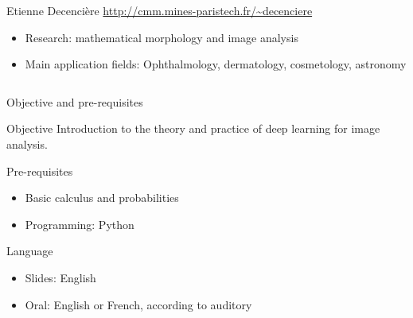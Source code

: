 \documentclass[xcolor=pdftex,dvipsnames,table,mathserif]{beamer}
\begin{document}
{\begin{columns}
\begin{column}{.8\textwidth}
    \begin{block}{Etienne Decencière \hfill \scriptsize{\url{http://cmm.mines-paristech.fr/\~decenciere}}}
      \scriptsize{
    \begin{itemize}
    \item Research: mathematical morphology and image analysis
    \item Main application fields: Ophthalmology, dermatology, cosmetology, astronomy
    \end{itemize}
    }
  \end{block}

  \end{column}
\end{columns}

}

\begin{frame}{Objective and pre-requisites}

  \begin{block}{Objective}
    Introduction to the theory and practice of deep learning for image analysis.
\end{block}

\begin{block}{Pre-requisites}
\begin{itemize}
\item Basic calculus and probabilities
\item Programming: Python
\end{itemize}
  \end{block}

  \begin{block}{Language}
    \begin{itemize}
    \item Slides: English
    \item Oral: English or French, according to auditory
    \end{itemize}

\end{block}


\end{frame}
\end{document}
